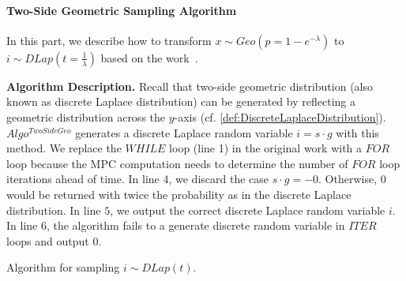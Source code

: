 \paragraph{Two-Side Geometric Sampling Algorithm}
\label{para:TwoSideGeometricSamplingAlgorithm}
In this part, we describe how to transform $x \sim Geo\left(p=1-e^{-\lambda}\right) $ to $i\sim DLap\left(t=\frac{1}{\lambda}\right) $ based on the work~\cite{googleDP2019}.

\textbf{Algorithm Description. }
Recall that two-side geometric distribution (also known as discrete Laplace distribution) can be generated by reflecting a geometric distribution across the $y$-axis (cf. \autoref{def:DiscreteLaplaceDistribution}).
$Algo^{TwoSideGeo}$ generates a discrete Laplace random variable $i=s\cdot g$ with this method. We replace the $WHILE$ loop (line 1) in the original work with a $FOR$ loop because the MPC computation needs to determine the number of $FOR$ loop iterations ahead of time.
In line $4$, we discard the case $s\cdot g =-0$. Otherwise, $0$ would be returned with twice the probability as in the discrete Laplace distribution.
In line $5$, we output the correct discrete Laplace random variable $i$.
In line $6$, the algorithm fails to a generate discrete random variable in $ITER$ loops and output $0$.

\begin{algorithm}[tbh!]
    \centering
    \caption{Algorithm for sampling $i\sim DLap\left(t\right) $.}
    \label{algo:TwoSideGeometric}
\end{algorithm}
\FloatBarrier


